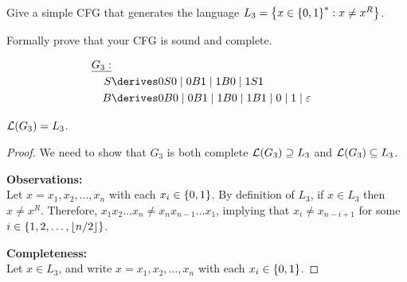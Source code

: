 \begin{problem}
  Give a simple CFG that generates the language
  $L_3 = \left\{x \in \left\{0, 1\right\}^* : x \ne x^R\right\}$.

  \step
  Formally prove that your CFG is sound and complete.
\end{problem}
\begin{Answer}
  \begin{align*}
    \underline{G_3:} \\
    S &\derives 0S0 \mid 0B1 \mid 1B0 \mid 1S1 \\
    B &\derives 0B0 \mid 0B1 \mid 1B0 \mid 1B1 \mid 0 \mid 1 \mid \eps
  \end{align*}

  \step
  \begin{claim}
    $\mathcal{L}(G_3) = L_3$.

    \begin{proof}
      We need to show that $G_3$ is both complete $\mathcal{L}(G_3) \supseteq L_3$
      and $\mathcal{L}(G_3) \subseteq L_3$.

      \step
      \textbf{Observations: } \\
      Let $x = x_1, x_2, \ldots, x_n$ with each $x_i \in \left\{0, 1\right\}$.
      By definition of $L_3$, if $x \in L_3$ then $x \ne x^R$.
      Therefore, $x_1x_2 \ldots x_n \ne x_nx_{n-1} \ldots x_1$,
      implying that $x_i \ne x_{n-i+1}$ for some $i \in \left\{1, 2, \ldots, \lfloor{} n/2 \rfloor\right\}$.

      \step
      \textbf{Completeness:} \\
      Let $x \in L_3$, and write $x = x_1, x_2, \ldots, x_n$
      with each $x_i \in \left\{0, 1\right\}$.


\end{proof}
\end{claim}
\end{Answer}
